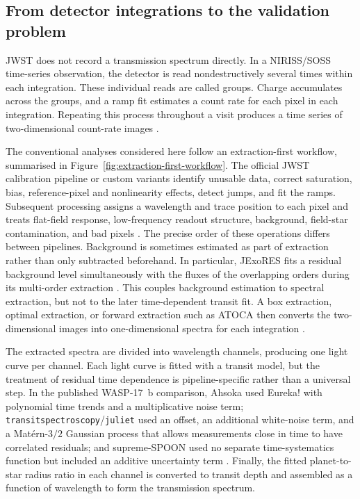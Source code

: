 \subsection{From detector integrations to the validation problem}
\label{sec:detector-to-validation}
\label{sec:detector-to-spectrum}
\label{sec:validation-problem}


JWST does not record a transmission spectrum directly. In a NIRISS/SOSS
time-series observation, the detector is read nondestructively several times
within each integration. These individual reads are called groups. Charge
accumulates across the groups, and a ramp fit estimates a count rate for each
pixel in each integration. Repeating this process throughout a visit produces a
time series of two-dimensional count-rate images
\citep{AlbertEtAl2023}.

The conventional analyses considered here follow an extraction-first workflow,
summarised in Figure~\ref{fig:extraction-first-workflow}. The official JWST
calibration pipeline or custom variants identify unusable data, correct
saturation, bias, reference-pixel and nonlinearity effects, detect jumps, and
fit the ramps. Subsequent processing assigns a wavelength and trace position to
each pixel and treats flat-field response, low-frequency readout structure,
background, field-star contamination, and bad pixels
\citep{BellEtAl2022,RadicaEtAl2023,LouieEtAl2025}. The precise order of these
operations differs between pipelines. Background is sometimes estimated as
part of extraction rather than only subtracted beforehand. In particular,
JExoRES fits a residual background level simultaneously with the fluxes of the
overlapping orders during its multi-order extraction
\citep{HolmbergMadhusudhan2023}. This couples background estimation to spectral
extraction, but not to the later time-dependent transit fit. A box extraction,
optimal extraction, or forward extraction such as ATOCA then converts the
two-dimensional images into one-dimensional spectra for each integration
\citep{Horne1986,DarveauBernierEtAl2022}.

The extracted spectra are divided into wavelength channels, producing one light
curve per channel. Each light curve is fitted with a transit model, but the
treatment of residual time dependence is pipeline-specific rather than a
universal step. In the published WASP-17~b comparison, Ahsoka used Eureka! with
polynomial time trends and a multiplicative noise term;
\texttt{transitspectroscopy}/\texttt{juliet} used an offset, an additional
white-noise term, and a Mat\'ern-$3/2$ Gaussian process that
allows measurements close in time to have correlated residuals; and
supreme-SPOON used no separate
time-systematics function but included an additive uncertainty term
\citep{LouieEtAl2025}. Finally, the
fitted planet-to-star radius ratio in each channel is converted to transit depth
and assembled as a function of wavelength to form the transmission spectrum.

